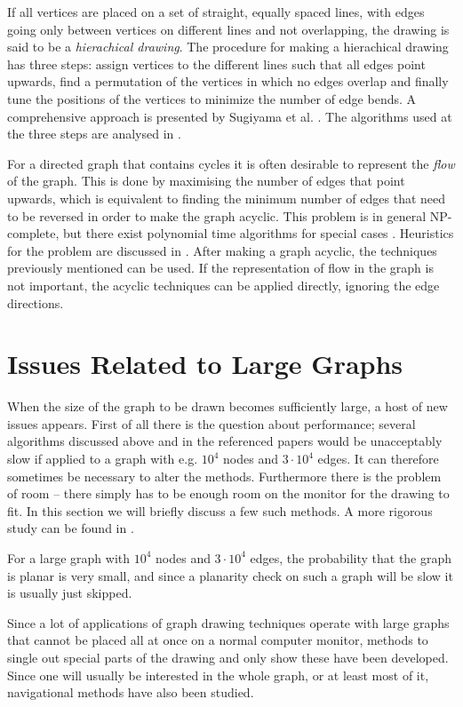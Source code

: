 If all vertices are placed on a set of straight, equally spaced lines, with
edges going only between vertices on different lines and not overlapping, the
drawing is said to be a \emph{hierachical drawing}. The procedure for making a
hierachical drawing has three steps: assign vertices to the different lines
such that all edges point upwards, find a permutation of the vertices in which
no edges overlap and finally tune the positions of the vertices to minimize
the number of edge bends. A comprehensive approach is presented by Sugiyama
et al. \cite{Sugiyama1981}. The algorithms used at the three steps are
analysed in \cite{Lin1992}.

For a directed graph that contains cycles it is often desirable to represent
the \emph{flow} of the graph. This is done by maximising the number of edges
that point upwards, which is equivalent to finding the minimum number of edges
that need to be reversed in order to make the graph acyclic. This problem is
in general NP-complete, but there exist polynomial time algorithms for special
cases \cite{Frank1981}. Heuristics for the problem are discussed in
\cite{Berger1990}. After making a graph acyclic, the techniques previously
mentioned can be used. If the representation of flow in the graph is not
important, the acyclic techniques can be applied directly, ignoring the edge
directions.

\section{Issues Related to Large Graphs}

When the size of the graph to be drawn becomes sufficiently large, a host of
new issues appears. First of all there is the question about performance;
several algorithms discussed above and in the referenced papers would be
unacceptably slow if applied to a graph with e.g. $10^4$ nodes and
$3\cdot10^4$ edges. It can therefore sometimes be necessary to alter the
methods. Furthermore there is the problem of room -- there simply has to be
enough room on the monitor for the drawing to fit. In this section we will
briefly discuss a few such methods. A more rigorous study can be found in
\cite{Herman2000}.

For a large graph with $10^4$ nodes and $3\cdot10^4$ edges, the probability
that the graph is planar is very small, and since a planarity check on such a
graph will be slow it is usually just skipped. 

Since a lot of applications of graph drawing techniques operate with large
graphs that cannot be placed all at once on a normal computer monitor, methods
to single out special parts of the drawing and only show these have been
developed. Since one will usually be interested in the whole graph, or at
least most of it, navigational methods have also been studied. 

